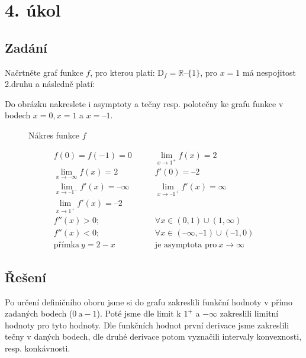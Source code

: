 \section{4. úkol}

\subsection{Zadání}
Načrtněte graf funkce $f$,
pro kterou platí: $\text{D}_{f} = \mathbb{R} – \{1\}$, pro $x = 1$ má nespojitost 2.druhu a následně platí:

Do obrázku nakreslete i asymptoty a tečny resp. polotečny ke grafu funkce v bodech $x = 0, x = 1$ a $x = –1$.

\begin{figure}[H]
	\centering
	
	\caption{Nákres funkce $f$}
\end{figure}


\begin{align*}
f(0) = f(-1) = 0&\qquad \lim_{x\rightarrow 1^{+}} f(x) = 2\\
\lim_{x\rightarrow –\infty} f(x) = 2&\qquad f'(0) = –2\\
\lim_{x\rightarrow –1^{-}} f'(x) = – \infty&\qquad \lim_{x\rightarrow –1^{+}} f'(x) = \infty\\
\lim_{x\rightarrow 1^{+}} f'(x) = – 2&\\
f''(x) > 0;&\qquad\forall x \in (0, 1) \cup (1, \infty)\\
f''(x) < 0;&\qquad\forall x \in (–\infty, –1) \cup (–1,0)\\
\text{přímka}\ y = 2 - x &\qquad\text{je asymptota pro}\ x\rightarrow \infty
\end{align*}

\subsection{Řešení}
Po určení definičního oboru jsme si do grafu zakreslili funkční hodnoty v přímo zadaných bodech ($0\ \text{a} -1$). Poté jsme dle limit k $1^+$ a $-\infty$ zakreslili limitní hodnoty pro tyto hodnoty. Dle funkčních hodnot první derivace jsme zakreslili tečny v daných bodech, dle druhé derivace potom vyznačili intervaly konvexnosti, resp. konkávnosti.
